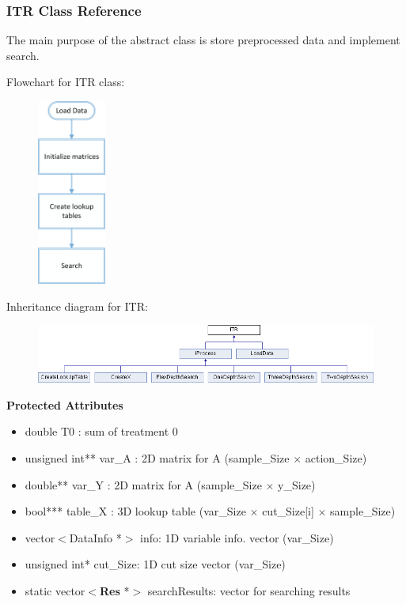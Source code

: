 \documentclass{article}
\begin{document}
\subsubsection{ITR Class Reference}
The main purpose of the abstract class is store preprocessed data and implement search.

Flowchart for ITR class:
\begin{figure}[H]
\centering
\includegraphics[width=0.20\textwidth]{ITR.png}
\end{figure}

Inheritance diagram for ITR:
\begin{figure}[H]
\centering
\includegraphics[width=1\textwidth]{class_i_t_r.png}
\end{figure}

\textbf{Protected Attributes}
\begin{itemize}
\item double T0 : sum of treatment 0
\item unsigned int** var\_A : 2D matrix for A  (sample\_Size $\times$ action\_Size) 
\item double** var\_Y : 2D matrix for A  (sample\_Size $\times$ y\_Size)
\item bool*** table\_X : 3D lookup table (var\_Size $\times$ cut\_Size[i] $\times$ sample\_Size) 
\item vector$<$DataInfo *$>$ info: 1D variable info. vector (var\_Size)
\item unsigned int* cut\_Size: 1D cut size vector (var\_Size)
\item static vector$<$\textbf{Res} *$>$ searchResults: vector for searching results
\end{itemize}
\end{document}
